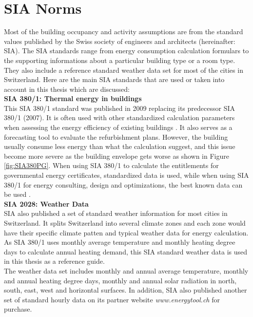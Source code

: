 \documentclass[a4paper, oneside]{discothesis}
\begin{document}
	\section{SIA Norms}
		Most of the building occupancy and activity assumptions are from the standard values published by the Swiss society of engineers and architects (hereinafter: SIA). The SIA standards range from energy consumption calculation formulars to the supporting informations about a particular building type or a room type. They also include a reference standard weather data set for most of the cities in Switzerland. Here are the main SIA standards that are used or taken into account in this thesis which are discussed:\\

		\textbf{SIA 380/1: Thermal energy in buildings}\\
		This SIA 380/1 standard was published in 2009 replacing its predecessor SIA 380/1 (2007). It is often used with other standardized calculation parameters when assessing the energy efficiency of existing buildings \cite{SIAPreviousreport}. It also serves as a forecasting tool to evaluate the refurbishment plans. However, the building usually consume less energy than what the calculation suggest, and this issue become more severe as the building envelope gets worse as shown in Figure \ref{fig:SIA380PG}. When using SIA 380/1 to calculate the entitlements for governmental energy certificates, standardized data is used, while when using SIA 380/1 for energy consulting, design and optimizations, the best known data can be used \cite{SIAPreviousreport}.\\


		\textbf{SIA 2028: Weather Data}\\
		SIA also published a set of standard weather information for most cities in Switzerland. It splits Switzerland into several climate zones and each zone would have their specific climate patten and typical weather data for energy calculation. As SIA 380/1 uses monthly average temperature and monthly heating degree days to calculate annual heating demand, this SIA standard weather data is used in this thesis as a reference guide.\\

		The weather data set includes monthly and annual average temperature, monthly and annual heating degree days, monthly and annual solar radiation in north, south, east, west and horizontal surfaces. In addition, SIA also published another set of standard hourly data on its partner website \textit{www.energytool.ch} for purchase.\\
\end{document}
